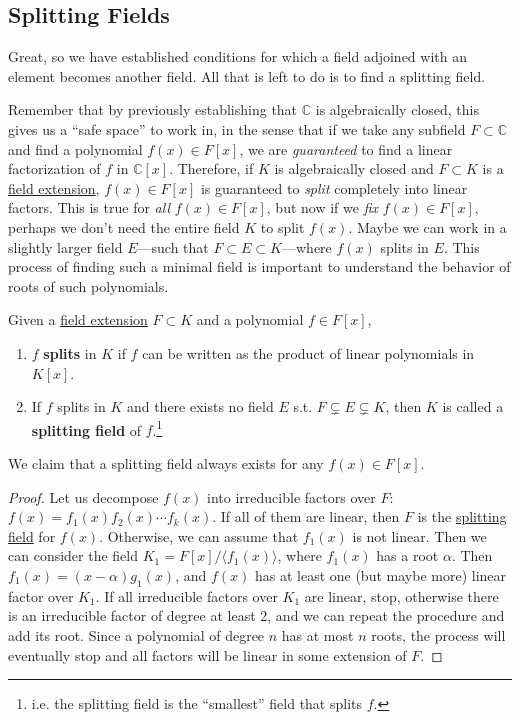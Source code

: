 \subsection{Splitting Fields} 

  Great, so we have established conditions for which a field adjoined with an element becomes another field. All that is left to do is to find a splitting field.

  Remember that by previously establishing that $\mathbb{C}$ is algebraically closed, this gives us a ``safe space'' to work in, in the sense that if we take any subfield $F \subset \mathbb{C}$ and find a polynomial $f(x) \in F[x]$, we are \textit{guaranteed} to find a linear factorization of $f$ in $\mathbb{C}[x]$. Therefore, if $K$ is algebraically closed and $F \subset K$ is a \hyperref[def:field-extension]{field extension}, $f(x) \in F[x]$ is guaranteed to \textit{split} completely into linear factors. This is true for \textit{all} $f(x) \in F[x]$, but now if we \textit{fix} $f(x) \in F[x]$, perhaps we don't need the entire field $K$ to split $f(x)$. Maybe we can work in a slightly larger field $E$---such that $F \subset E \subset K$---where $f(x)$ splits in $E$. This process of finding such a minimal field is important to understand the behavior of roots of such polynomials. 

  \begin{definition}
    \label{def:splitting-field}
    Given a \hyperref[def:field-extension]{field extension} $F \subset K$ and a polynomial $f \in F[x]$, 
    \begin{enumerate}
      \item $f$ \textbf{splits} in $K$ if $f$ can be written as the product of linear polynomials in $K[x]$. 
      \item If $f$ splits in $K$ and there exists no field $E$ s.t. $F \subsetneq E \subsetneq K$, then $K$ is called a \textbf{splitting field} of $f$.\footnote{i.e. the splitting field is the ``smallest'' field that splits $f$.} 
    \end{enumerate}
    We claim that a splitting field always exists for any $f(x) \in F[x]$.
  \end{definition}
  \begin{proof}
    Let us decompose $f(x)$ into irreducible factors over $F$: $f(x) = f_1(x)f_2(x)\cdots f_k(x)$. If all of them are linear, then $F$ is the \hyperref[def:splitting-field]{splitting field} for $f(x)$. Otherwise, we can assume that $f_1(x)$ is not linear. Then we can consider the field $K_1 = F[x]/\langle f_1(x) \rangle$, where $f_1(x)$ has a root $\alpha$. Then $f_1(x) = (x - \alpha)g_1(x)$, and $f(x)$ has at least one (but maybe more) linear factor over $K_1$. If all irreducible factors over $K_1$ are linear, stop, otherwise there is an irreducible factor of degree at least 2, and we can repeat the procedure and add its root. Since a polynomial of degree $n$ has at most $n$ roots, the process will eventually stop and all factors will be linear in some extension of $F$.
  \end{proof} 

